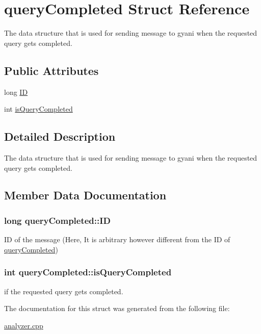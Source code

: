\hypertarget{structqueryCompleted}{\section{query\-Completed \-Struct \-Reference}
\label{structqueryCompleted}
}


\-The data structure that is used for sending message to gyani when the requested query gets completed.  


\subsection*{\-Public \-Attributes}
\begin{DoxyCompactItemize}
\item 
long \hyperlink{structqueryCompleted_a9fedee40d6e2c162113eff44d6d61098}{\-I\-D}
\item 
int \hyperlink{structqueryCompleted_ab4c608efc271de289ca8536d5edb5a4a}{is\-Query\-Completed}
\end{DoxyCompactItemize}


\subsection{\-Detailed \-Description}
\-The data structure that is used for sending message to gyani when the requested query gets completed. 

\subsection{\-Member \-Data \-Documentation}
\hypertarget{structqueryCompleted_a9fedee40d6e2c162113eff44d6d61098}{
\subsubsection[{\-I\-D}]{\setlength{\rightskip}{0pt plus 5cm}long {\bf query\-Completed\-::\-I\-D}}}\label{structqueryCompleted_a9fedee40d6e2c162113eff44d6d61098}
\-I\-D of the message (\-Here, \-It is arbitrary however different from the \-I\-D of \hyperlink{structqueryCompleted}{query\-Completed}) \hypertarget{structqueryCompleted_ab4c608efc271de289ca8536d5edb5a4a}{
\subsubsection[{is\-Query\-Completed}]{\setlength{\rightskip}{0pt plus 5cm}int {\bf query\-Completed\-::is\-Query\-Completed}}}\label{structqueryCompleted_ab4c608efc271de289ca8536d5edb5a4a}
if the requested query gets completed. 

\-The documentation for this struct was generated from the following file\-:\begin{DoxyCompactItemize}
\item 
\hyperlink{analyzer_8cpp}{analyzer.\-cpp}\end{DoxyCompactItemize}
